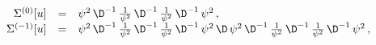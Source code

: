 \begin{equation}\label{eq:neg sym}
\begin{array}{rcl}
 \Sigma^{(0)}[u] &=&
 {\psi^2}\,\D^{-1}\,\frac{1}{\psi^2}\,\D^{-1}\,\frac{1}{\psi^2}\,\D^{-1}\,{\psi^2}\,,
\\
\Sigma^{(-1)}[u] &=&
{\psi^2}\,\D^{-1}\,\frac{1}{\psi^2}\,\D^{-1}\,\frac{1}{\psi^2}\,\D^{-1}\,{\psi^2}\,\D\,{\psi^2}\,\D^{-1}\,\frac{1}{\psi^2}\,\D^{-1}\,\frac{1}{\psi^2}\,\D^{-1}\,{\psi^2}\,,
\end{array}
\end{equation}

